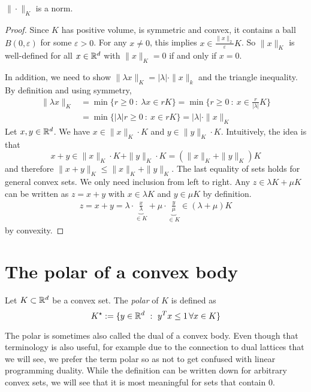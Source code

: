 \begin{lemma}
  $\|\cdot\|_K$ is a norm.
\end{lemma}
\begin{proof}
  Since $K$ has positive volume, is symmetric and convex,
  it contains a ball $B(0,\varepsilon)$ for some $\varepsilon > 0$.
  For any $x \neq 0$, this implies $x \in \frac{\|x\|_2}{\varepsilon} K$.
  So $\|x\|_K$ is well-defined for all $x \in \mathbb{R}^d$
  with $\|x\|_K = 0$ if and only if $x = 0$.

  In addition, we need to show $\|\lambda x\|_K = |\lambda| \cdot \|x\|_k$
  and the triangle inequality.
  By definition and using symmetry,
  \begin{align*}
    \|\lambda x\|_K
      &= \min\{ r \geq 0 ~:~ \lambda x \in r K \}
      = \min\{ r \geq 0 ~:~ x \in \frac{r}{|\lambda|} K \}
 \\ & = \min\{ |\lambda| r \geq 0 ~:~ x \in r K \}
      = |\lambda| \cdot \|x\|_K
  \end{align*}
  Let $x, y \in \mathbb{R}^d$.
  We have $x \in \|x\|_K \cdot K$ and $y \in \|y\|_K \cdot K$.
  Intuitively, the idea is that
  \[
    x + y \in \|x\|_K \cdot K + \|y\|_K \cdot K = (\|x\|_K + \|y\|_K) K
  \]
  and therefore $\|x+y\|_K \leq \|x\|_K + \|y\|_K$.
  The last equality of sets holds for general convex sets.
  We only need inclusion from left to right.
  Any $z \in \lambda K + \mu K$ can be written as $z = x + y$
  with $x \in \lambda K$ and $y \in \mu K$ by definition.
  \begin{align*}
    z = x + y = \lambda \cdot \underbrace{\frac{x}{\lambda}}_{\in K}
      + \mu \cdot \underbrace{\frac{y}{\mu}}_{\in K} \in (\lambda + \mu) K
  \end{align*}
  by convexity.
\end{proof}



\section{The polar of a convex body}

\begin{definition}
  Let $K \subset \mathbb{R}^d$ be a convex set.
  The \emph{polar} of $K$ is defined as
  \[
    K^\star := \{ y \in \mathbb{R}^d ~:~ y^Tx \leq 1 \,\forall x \in K \}
  \]
\end{definition}

The polar is sometimes also called the dual of a convex body.
Even though that terminology is also useful,
for example due to the connection to dual lattices that we will see,
we prefer the term polar so as not to get confused with linear programming duality.
While the definition can be written down for arbitrary convex sets,
we will see that it is most meaningful for sets that contain $0$.

